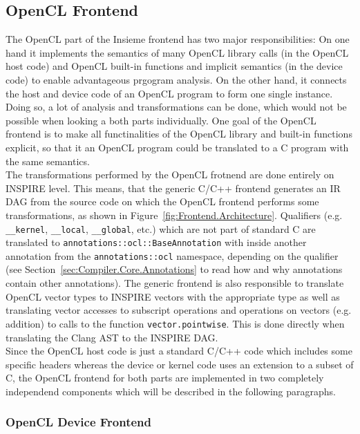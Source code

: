 \subsection{OpenCL Frontend}
\label{sec:Insieme.OpenCL}

The OpenCL part of the Insieme frontend has two major responsibilities: On one hand it implements the semantics of many OpenCL library calls (in the OpenCL host code) and OpenCL built-in functions and implicit semantics (in the device code) to enable advantageous prgogram analysis. On the other hand, it connects the host and device code of an OpenCL program to form one single instance. Doing so, a lot of analysis and transformations can be done, which would not be possible when looking a both parts individually. One goal of the OpenCL frontend is to make all functinalities of the OpenCL library and built-in functions explicit, so that it an OpenCL program could be translated to a C program with the same semantics. \\

The transformations performed by the OpenCL frotnend are done entirely on INSPIRE level. This means, that the generic C/C++ frontend generates an IR DAG from the source code on which the OpenCL frontend performs some transformations, as shown in Figure~\ref{fig:Frontend.Architecture}. Qualifiers (e.g. \texttt{\_\_kernel}, \texttt{\_\_local}, \texttt{\_\_global}, etc.) which are not part of standard C are translated to \texttt{annotations::ocl::BaseAnnotation} with inside another annotation from the \texttt{annotations::ocl} namespace, depending on the qualifier (see Section~\ref{sec:Compiler.Core.Annotations} to read how and why annotations contain other annotations). The generic frontend is also responsible to translate OpenCL vector types to INSPIRE vectors with the appropriate type as well as translating vector accesses to subscript operations and operations on vectors (e.g. addition) to calls to the function \texttt{vector.pointwise}. This is done directly when translating the Clang AST to the INSPIRE DAG. \\

Since the OpenCL host code is just a standard C/C++ code which includes some specific headers whereas the device or kernel code uses an extension to a subset of C, the OpenCL frontend for both parts are implemented in two completely independend components which will be described in the following paragraphs. \\


\subsubsection{OpenCL Device Frontend}
\label{sec:Insieme.DeviceCL}

